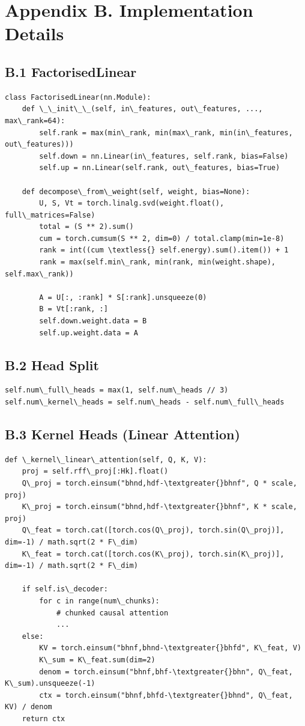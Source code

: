 
\section{Appendix B. Implementation Details}

\subsection{B.1 FactorisedLinear}

\begin{lstlisting}
class FactorisedLinear(nn.Module):
    def \_\_init\_\_(self, in\_features, out\_features, ..., max\_rank=64):
        self.rank = max(min\_rank, min(max\_rank, min(in\_features, out\_features)))
        self.down = nn.Linear(in\_features, self.rank, bias=False)
        self.up = nn.Linear(self.rank, out\_features, bias=True)

    def decompose\_from\_weight(self, weight, bias=None):
        U, S, Vt = torch.linalg.svd(weight.float(), full\_matrices=False)
        total = (S ** 2).sum()
        cum = torch.cumsum(S ** 2, dim=0) / total.clamp(min=1e-8)
        rank = int((cum \textless{} self.energy).sum().item()) + 1
        rank = max(self.min\_rank, min(rank, min(weight.shape), self.max\_rank))
        
        A = U[:, :rank] * S[:rank].unsqueeze(0)
        B = Vt[:rank, :]
        self.down.weight.data = B
        self.up.weight.data = A
\end{lstlisting}

\subsection{B.2 Head Split}

\begin{lstlisting}
self.num\_full\_heads = max(1, self.num\_heads // 3)
self.num\_kernel\_heads = self.num\_heads - self.num\_full\_heads
\end{lstlisting}

\subsection{B.3 Kernel Heads (Linear Attention)}

\begin{lstlisting}
def \_kernel\_linear\_attention(self, Q, K, V):
    proj = self.rff\_proj[:Hk].float()
    Q\_proj = torch.einsum("bhnd,hdf-\textgreater{}bhnf", Q * scale, proj)
    K\_proj = torch.einsum("bhnd,hdf-\textgreater{}bhnf", K * scale, proj)
    Q\_feat = torch.cat([torch.cos(Q\_proj), torch.sin(Q\_proj)], dim=-1) / math.sqrt(2 * F\_dim)
    K\_feat = torch.cat([torch.cos(K\_proj), torch.sin(K\_proj)], dim=-1) / math.sqrt(2 * F\_dim)
    
    if self.is\_decoder:
        for c in range(num\_chunks):
            # chunked causal attention
            ...
    else:
        KV = torch.einsum("bhnf,bhnd-\textgreater{}bhfd", K\_feat, V)
        K\_sum = K\_feat.sum(dim=2)
        denom = torch.einsum("bhnf,bhf-\textgreater{}bhn", Q\_feat, K\_sum).unsqueeze(-1)
        ctx = torch.einsum("bhnf,bhfd-\textgreater{}bhnd", Q\_feat, KV) / denom
    return ctx
\end{lstlisting}

